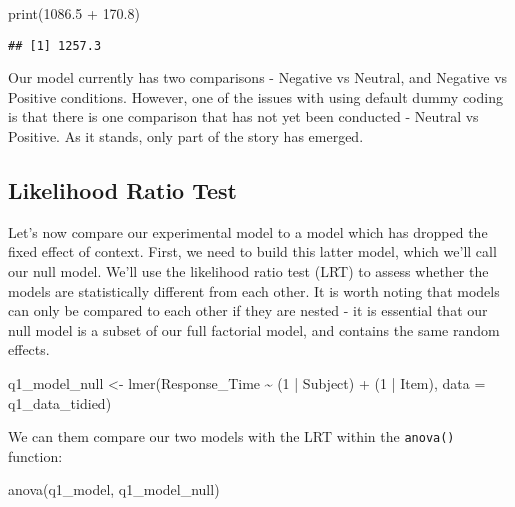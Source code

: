\documentclass[
]{article}
\newenvironment{Shaded}{\begin{snugshade}}{\end{snugshade}}
\newcommand{\AttributeTok}[1]{\textcolor[rgb]{0.77,0.63,0.00}{#1}}
\newcommand{\DecValTok}[1]{\textcolor[rgb]{0.00,0.00,0.81}{#1}}
\newcommand{\FloatTok}[1]{\textcolor[rgb]{0.00,0.00,0.81}{#1}}
\newcommand{\FunctionTok}[1]{\textcolor[rgb]{0.00,0.00,0.00}{#1}}
\newcommand{\NormalTok}[1]{#1}
\newcommand{\OtherTok}[1]{\textcolor[rgb]{0.56,0.35,0.01}{#1}}
\newcommand{\SpecialCharTok}[1]{\textcolor[rgb]{0.00,0.00,0.00}{#1}}
\begin{document}
\begin{Shaded}
\begin{Highlighting}[]
\FunctionTok{print}\NormalTok{(}\FloatTok{1086.5} \SpecialCharTok{+} \FloatTok{170.8}\NormalTok{)}
\end{Highlighting}
\end{Shaded}

\begin{verbatim}
## [1] 1257.3
\end{verbatim}

Our model currently has two comparisons - Negative vs Neutral, and
Negative vs Positive conditions. However, one of the issues with using
default dummy coding is that there is one comparison that has not yet
been conducted - Neutral vs Positive. As it stands, only part of the
story has emerged.

\hypertarget{likelihood-ratio-test}{%
\subsection{Likelihood Ratio Test}\label{likelihood-ratio-test}}

Let's now compare our experimental model to a model which has dropped
the fixed effect of context. First, we need to build this latter model,
which we'll call our null model. We'll use the likelihood ratio test
(LRT) to assess whether the models are statistically different from each
other. It is worth noting that models can only be compared to each other
if they are nested - it is essential that our null model is a subset of
our full factorial model, and contains the same random effects.

\begin{Shaded}
\begin{Highlighting}[]
\NormalTok{q1\_model\_null }\OtherTok{\textless{}{-}} \FunctionTok{lmer}\NormalTok{(Response\_Time }\SpecialCharTok{\textasciitilde{}} 
\NormalTok{                        (}\DecValTok{1} \SpecialCharTok{|}\NormalTok{ Subject) }\SpecialCharTok{+}
\NormalTok{                        (}\DecValTok{1} \SpecialCharTok{|}\NormalTok{ Item),}
                    \AttributeTok{data =}\NormalTok{ q1\_data\_tidied)}
\end{Highlighting}
\end{Shaded}

We can them compare our two models with the LRT within the
\texttt{anova()} function:

\begin{Shaded}
\begin{Highlighting}[]
\FunctionTok{anova}\NormalTok{(q1\_model, q1\_model\_null)}
\end{Highlighting}
\end{Shaded}
\end{document}
